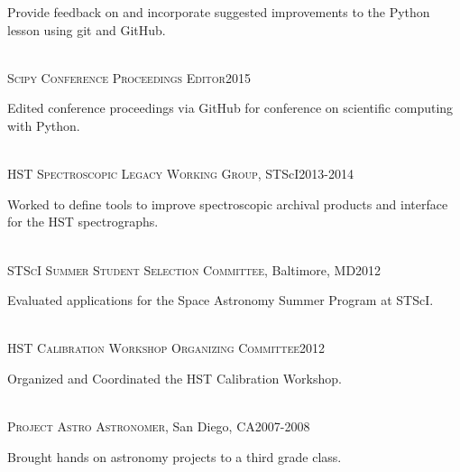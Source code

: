 \documentclass[10pt]{cv}
\begin{document}
\begin{llist}
\begin{minipage}[l]{0.7\textwidth}
Provide feedback on and incorporate suggested improvements to the Python lesson using git and GitHub.\\
\end{minipage}\vspace{0.15cm}
\\
\textsc{Scipy Conference Proceedings Editor}\hfill 2015\\
\begin{minipage}[l]{0.7\textwidth}\vspace{0.15cm}
Edited conference proceedings via GitHub for conference on scientific computing with Python.\\
\end{minipage}\vspace{0.15cm}
\\
\textsc{HST Spectroscopic Legacy Working Group}, STScI\hfill2013-2014\\
\begin{minipage}[l]{0.7\textwidth}\vspace{0.15cm}
Worked to define tools to improve spectroscopic archival products and interface for the HST spectrographs.\\
\end{minipage}\vspace{0.15cm}
\\
\textsc{STScI Summer Student Selection Committee}, Baltimore, MD\hfill2012\\
\begin{minipage}[l]{0.7\textwidth}\vspace{0.15cm}
Evaluated applications for the Space Astronomy Summer Program at STScI.\\
\end{minipage}\vspace{0.15cm}
\\
\textsc{HST Calibration Workshop Organizing Committee}\hfill 2012\\
\begin{minipage}[l]{0.7\textwidth}\vspace{0.15cm}
Organized and Coordinated the HST Calibration Workshop.\\
\end{minipage}\vspace{0.15cm}
\\
\textsc{Project Astro Astronomer}, San Diego, CA\hfill 2007-2008\\
\begin{minipage}[l]{0.7\textwidth}\vspace{0.15cm}
Brought hands on astronomy projects to a third grade class.\\

\end{minipage}
\end{llist}
\end{document}
